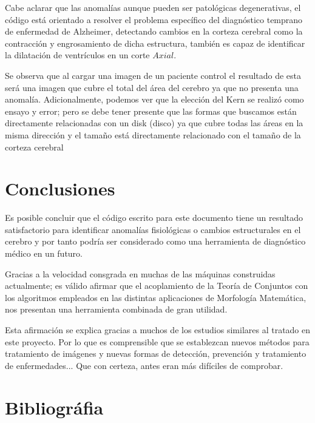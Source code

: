 \documentclass[12pt]{article}
\begin{document}
Cabe aclarar que las anomalías aunque pueden ser patológicas degenerativas, el código está orientado a resolver el problema específico del diagnóstico temprano de enfermedad de Alzheimer, detectando cambios en la corteza cerebral como la contracción y engrosamiento de dicha estructura, también es capaz de identificar la dilatación de ventrículos en un corte $Axial$.

Se observa que al cargar una imagen de un paciente control el resultado de esta será una imagen que cubre el total del área del cerebro ya que no presenta una anomalía. Adicionalmente, podemos ver que la elección del Kern se realizó como ensayo y error; pero  se debe tener presente que las formas que buscamos están directamente relacionadas con un disk (disco) ya que cubre todas las áreas en la misma dirección y el tamaño está directamente relacionado con el tamaño de la corteza cerebral

\section{\color{Black}Conclusiones}

Es posible concluir que el código escrito para este documento  tiene un resultado satisfactorio para identificar anomalías fisiológicas o cambios estructurales en el cerebro y por tanto podría ser considerado como una herramienta de diagnóstico médico en un futuro.

Gracias a la velocidad consgrada en muchas de las máquinas construidas actualmente; es válido afirmar que el acoplamiento de la Teoría de Conjuntos con los algoritmos empleados en las distintas aplicaciones de Morfología Matemática, nos presentan una herramienta combinada de gran utilidad.

Esta afirmación se explica gracias a muchos de los estudios similares al tratado en este proyecto. Por lo que es comprensible que se establezcan nuevos métodos para tratamiento de imágenes y nuevas formas de detección, prevención y tratamiento de enfermedades... Que con certeza, antes eran más difíciles de comprobar.




\newpage
\section{\color{Black}Bibliográfia}


\end{document}

